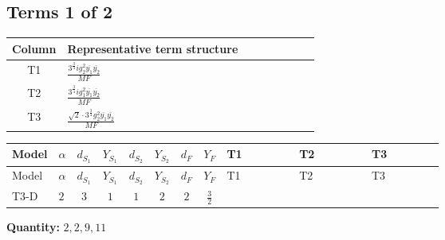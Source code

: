 \documentclass[8pt]{article}
\begin{document}
\begin{landscape}
\subsection*{Terms 1 of 2}
\begin{center}
\begin{tabular}{@{}c >{\raggedright\arraybackslash}p{0.82\linewidth}@{}}
\toprule
Column & Representative term structure \\
\midrule
T1 & \(\displaystyle \frac{3^{\frac{3}{4}} i g_{2}^{2} \overline{y_{1}} \overline{y_{2}}}{MF}\) \\
\midrule
T2 & \(\displaystyle \frac{3^{\frac{3}{4}} i g_{1}^{2} \overline{y_{1}} \overline{y_{2}}}{MF}\) \\
\midrule
T3 & \(\displaystyle \frac{\sqrt{2} \cdot 3^{\frac{3}{4}} g_{2}^{2} \overline{y_{1}} \overline{y_{2}}}{MF}\) \\
\midrule
\bottomrule
\end{tabular}
\end{center}
\smallskip
\tiny
\begin{longtable}{@{}llcccccc >{\raggedright\arraybackslash}p{0.21\linewidth} >{\raggedright\arraybackslash}p{0.21\linewidth} >{\raggedright\arraybackslash}p{0.21\linewidth}@{}}
\toprule
Model & $\alpha$ & $d_{S_1}$ & $Y_{S_1}$ & $d_{S_2}$ & $Y_{S_2}$ & $d_F$ & $Y_F$ & T1 & T2 & T3 \\
\midrule
\endfirsthead
\toprule
Model & $\alpha$ & $d_{S_1}$ & $Y_{S_1}$ & $d_{S_2}$ & $Y_{S_2}$ & $d_F$ & $Y_F$ & T1 & T2 & T3 \\
\midrule
\endhead
T3-D & $2$ & $3$ & $1$ & $1$ & $2$ & $2$ & $\frac{3}{2}$ & \scriptsize\adjustbox{max width=\linewidth}{$\begin{gathered} - \frac{17 \cdot 3^{\frac{3}{4}} i g_{2}^{2} \overline{y_{1}} \overline{y_{2}}}{24 MF}\end{gathered}$} & \scriptsize\adjustbox{max width=\linewidth}{$\begin{gathered} - \frac{9 \cdot 3^{\frac{3}{4}} i g_{1}^{2} \overline{y_{1}} \overline{y_{2}}}{8 MF}\end{gathered}$} & \scriptsize\adjustbox{max width=\linewidth}{$\begin{gathered} - \frac{\sqrt{2} \cdot 3^{\frac{3}{4}} g_{2}^{2} \overline{y_{1}} \overline{y_{2}}}{3 MF}\end{gathered}$} \\
\midrule
\bottomrule
\end{longtable}
\clearpage
\noindent\textbf{Quantity: }$\mathrm{2,2,9,11}$\par\smallskip

\end{landscape}
\end{document}
